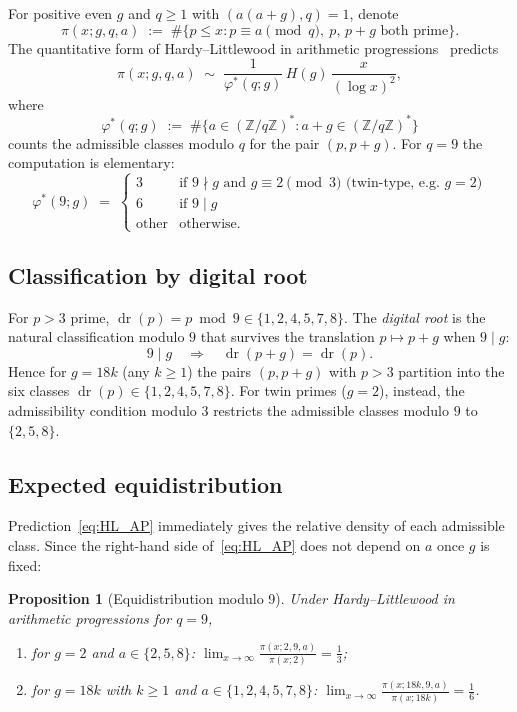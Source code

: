 \documentclass[11pt]{amsart}
\theoremstyle{plain}
\newtheorem{proposition}[theorem]{Proposition}
\theoremstyle{definition}
\theoremstyle{remark}
\DeclareMathOperator{\dr}{dr}
\begin{document}
For positive even $g$ and $q \ge 1$ with $(a(a+g),q)=1$, denote
\[
  \pi(x;g,q,a) \;:=\; \#\bigl\{p \le x : p \equiv a \pmod q,\ p,\,p+g
  \text{ both prime}\bigr\}.
\]
The quantitative form of Hardy--Littlewood in arithmetic
progressions~\cite[\S 5]{IK04} predicts
\begin{equation}\label{eq:HL_AP}
  \pi(x;g,q,a) \;\sim\; \frac{1}{\varphi^*(q;g)}\, H(g) \,\frac{x}{(\log x)^2},
\end{equation}
where
\begin{equation}\label{eq:phi_star}
  \varphi^*(q;g) \;:=\; \#\bigl\{a \in (\mathbb{Z}/q\mathbb{Z})^*
  : a + g \in (\mathbb{Z}/q\mathbb{Z})^*\bigr\}
\end{equation}
counts the admissible classes modulo $q$ for the pair $(p,p+g)$. For
$q=9$ the computation is elementary:
\[
  \varphi^*(9;g) \;=\;
  \begin{cases}
    3 & \text{if } 9 \nmid g \text{ and } g \equiv 2 \!\!\!\pmod 3
    \text{ (twin-type, e.g.\ } g=2\text{)} \\
    6 & \text{if } 9 \mid g \\
    \text{other} & \text{otherwise.}
  \end{cases}
\]

\subsection{Classification by digital root}

For $p > 3$ prime, $\dr(p) = p \bmod 9 \in \{1,2,4,5,7,8\}$.
The \emph{digital root} is the natural classification modulo $9$ that
survives the translation $p \mapsto p+g$ when $9 \mid g$:
\[
  9 \mid g \quad\Longrightarrow\quad \dr(p+g) = \dr(p).
\]
Hence for $g = 18k$ (any $k \ge 1$) the pairs $(p,p+g)$ with $p > 3$
partition into the six classes $\dr(p) \in \{1,2,4,5,7,8\}$. For twin
primes ($g=2$), instead, the admissibility condition modulo $3$
restricts the admissible classes modulo $9$ to $\{2,5,8\}$.

\subsection{Expected equidistribution}

Prediction~\eqref{eq:HL_AP} immediately gives the relative density of
each admissible class. Since the right-hand side
of~\eqref{eq:HL_AP} does not depend on $a$ once $g$ is fixed:

\begin{proposition}[Equidistribution modulo 9]\label{prop:equipart}
Under Hardy--Littlewood in arithmetic progressions for $q=9$,
\begin{enumerate}
\item for $g=2$ and $a \in \{2,5,8\}$:
$\displaystyle\lim_{x\to\infty}\frac{\pi(x;2,9,a)}{\pi(x;2)} = \frac{1}{3}$;
\item for $g=18k$ with $k \ge 1$ and $a \in \{1,2,4,5,7,8\}$:
$\displaystyle\lim_{x\to\infty}\frac{\pi(x;18k,9,a)}{\pi(x;18k)} = \frac{1}{6}$.
\end{enumerate}
\end{proposition}
\end{document}
